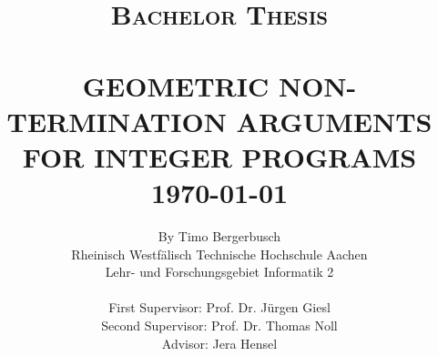 
\title{ \normalsize \textsc{Bachelor Thesis}
	\\ [2.0cm]
	\HRule{0.5pt} \\
	\LARGE \textbf{\uppercase{Geometric Non-Termination Arguments for Integer Programs}}
	\HRule{2pt} \\ [0.5cm]
	\normalsize \today \vspace*{5\baselineskip}}

\date{}

\author{
	By Timo Bergerbusch\\ 
	Rheinisch Westfälisch Technische Hochschule Aachen \\
	Lehr- und Forschungsgebiet Informatik 2  \\ \\
	First Supervisor: Prof. Dr. Jürgen Giesl \\
	Second Supervisor: Prof. Dr. Thomas Noll \\
	Advisor: Jera Hensel
	}

\maketitle